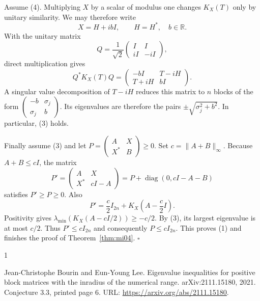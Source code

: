 \documentclass[10pt,a4paper]{article}
\theoremstyle{remark}
\newcommand{\R}{\mathbb R}
\newcommand{\diag}{\operatorname{diag}}
\newcommand{\opnorm}[1]{\lVert #1\rVert_{\infty}}
\begin{document}
Assume (4). Multiplying $X$ by a scalar of modulus one changes $K_X(T)$ only by unitary similarity. We may therefore write
\[
 X=H+ibI,\qquad H=H^*,\quad b\in\R.
\]
With the unitary matrix
\[
 Q=\frac1{\sqrt2}\begin{pmatrix}I&I\\ iI&-iI\end{pmatrix},
\]
direct multiplication gives
\[
 Q^*K_X(T)Q
 =\begin{pmatrix}-bI&T-iH\\T+iH&bI\end{pmatrix}.
\]
A singular value decomposition of $T-iH$ reduces this matrix to $n$ blocks of the form
$\begin{pmatrix}-b&\sigma_j\\\sigma_j&b\end{pmatrix}$.
Its eigenvalues are therefore the pairs
$\pm\sqrt{\sigma_j^2+b^2}$. In particular, (3) holds.

Finally assume (3) and let
$P=\begin{pmatrix}A&X\\X^*&B\end{pmatrix}\geq0$.
Set $c=\opnorm{A+B}$. Because $A+B\leq cI$, the matrix
\[
 P'=\begin{pmatrix}A&X\\X^*&cI-A\end{pmatrix}
 =P+\diag(0,cI-A-B)
\]
satisfies $P'\geq P\geq0$. Also
\[
 P'=\frac c2I_{2n}+K_X\left(A-\frac c2I\right).
\]
Positivity gives $\lambda_{\min}(K_X(A-cI/2))\geq-c/2$. By (3), its largest eigenvalue is at most $c/2$. Thus $P'\leq cI_{2n}$ and consequently $P\leq cI_{2n}$. This proves (1) and finishes the proof of Theorem~\ref{thm:mi04}.
\hfill$\square$

\begin{thebibliography}{1}

Jean-Christophe Bourin and Eun-Young Lee.
\newblock Eigenvalue inequalities for positive block matrices with the inradius
  of the numerical range.
\newblock arXiv:2111.15180, 2021.
\newblock Conjecture 3.3, printed page 6.
\newblock URL: \url{https://arxiv.org/abs/2111.15180}.

\end{thebibliography}
\end{document}
